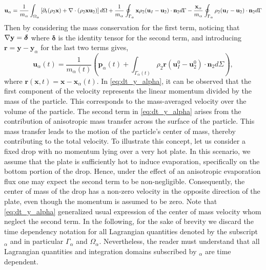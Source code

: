 \begin{equation}
    \textbf{u}_\alpha = 
    \frac{1}{m_\alpha}\int_{\Omega_\alpha}  \left[
        \partial_t (\rho_2 \textbf{x}) + \mathbf{\nabla}\cdot\left(\rho_2 \textbf{x}\textbf{u}_2\right) 
    \right] d\Omega \\
    + \frac{1}{m_\alpha}\oint_{\Gamma_\alpha}  \textbf{x} \rho_2(\textbf{u}_I   - \textbf{u}_2) \cdot \textbf{n}_2  d\Gamma
    -  \frac{\textbf{x}_\alpha}{m_\alpha}    \oint_{\Gamma_\alpha}  \rho_2(\textbf{u}_I   - \textbf{u}_2) \cdot \textbf{n}_2  d\Gamma
\end{equation}
Then by considering the mass conservation for the first term, noticing that $\mathbf{\nabla} \textbf{y} = \bm\delta$ where $\bm\delta$ is the identity tensor for the second term, and introducing $\mathbf{r} = \mathbf{y} - \mathbf{y}_\alpha$ for the last two terms gives, 
\begin{equation}
    \textbf{u}_\alpha(t) = \frac{1}{m_\alpha(t)} \left(
        \textbf{p}_\alpha(t)
        +  \int_{\Gamma_\alpha(t)} \rho_2 \textbf{r} (\textbf{u}_I^0 - \textbf{u}_2^0)\cdot \textbf{n}_2 d\Sigma
        \right),
        \label{eq:dt_y_alpha}
\end{equation}
where $\textbf{r}(\textbf{x},t) = \textbf{x} - \textbf{x}_\alpha(t)$. 
In \ref{eq:dt_y_alpha}, it can be observed that the first component of the velocity represents the linear momentum divided by the mass of the particle. 
This corresponds to the mass-averaged velocity over the volume of the particle.
The second term in \ref{eq:dt_y_alpha} arises from the contribution of anisotropic mass transfer across the surface of the particle. 
This mass transfer leads to the motion of the particle's center of mass, thereby contributing to the total velocity.
To illustrate this concept, let us consider a fixed drop with no momentum lying over a very hot plate.
In this scenario, we assume that the plate is sufficiently hot to induce evaporation, specifically on the bottom portion of the drop.
Hence, under the effect of an anisotropic evaporation flux one may expect the second term to be non-negligible.
Consequently, the center of mass of the drop has a non-zero velocity in the opposite direction of the plate, even though the momentum is assumed to be zero.
Note that \ref{eq:dt_y_alpha} generalized usual expression of the center of mass velocity whom neglect the second term.
In the following, for the sake of brevity we discard the time dependency notation for all Lagrangian quantities denoted by the subscript $_\alpha$ and in particular $\Gamma_\alpha$ and $\Omega_\alpha$.
Nevertheless, the reader must understand that all Lagrangian quantities and integration domains subscribed by $_\alpha$ are time dependent. 

